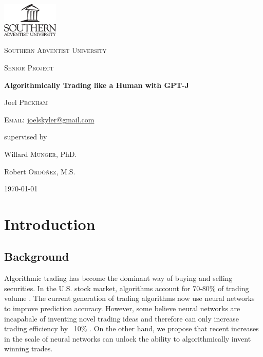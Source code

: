 \documentclass[conference]{IEEEtran}
\begin{document}
\begin{titlepage}
	\centering
	\includegraphics[width=0.2\textwidth]{logoBlackV.eps}\par
	\vspace{1.5cm}
	{\scshape\LARGE Southern Adventist University \par}
	\vfill
	{\scshape\Large Senior Project\par}
	\vspace{1cm}
	{\huge\bfseries Algorithmically Trading like a Human with GPT-J\par}
	\vspace{1cm}
	{\large Joel \textsc{Peckham}\par}
	\textsc{Email:} \href{mailto:joelskyler@gmail.com}{joelskyler@gmail.com}\par
	
	\vspace{0.5cm}
	supervised by\par
	Willard \textsc{Munger}, PhD.\par
	Robert \textsc{Ordóñez}, M.S.
	\vfill
	\begin{abstract}
		\lipsum[1]
	\end{abstract}
	
	\vfill
	
	{\large \today\par}
\end{titlepage}
\onecolumn
\tableofcontents
\listoffigures
\listoftables
\twocolumn

\section{Introduction}
\subsection{Background}
Algorithmic trading has become the dominant way of buying and selling securities. In the U.S. stock market, algorithms account for 70-80\% of trading volume \cite{Samuelsson2021}. The current generation of trading algorithms now use neural networks to improve prediction accuracy. However, some believe neural networks are incapabale of inventing novel trading ideas and therefore can only increase trading efficiency by ~10\% \cite{Vonko2021}. On the other hand, we propose that recent increases in the scale of neural networks can unlock the ability to algorithmically invent winning trades. 
\end{document}
